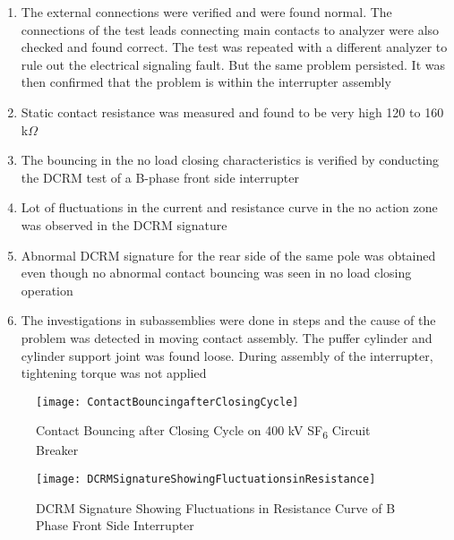 \begin{enumerate}
\item The external connections were verified and were found normal. The connections of the test leads connecting main contacts to analyzer were also checked and found correct. The test was repeated with a different analyzer to rule out the electrical signaling fault. But the same problem persisted. It was then confirmed that the problem is within the interrupter assembly

\item Static contact resistance was measured and found to be very high 120 to 160 k$\Omega$

\item The bouncing in the no load closing characteristics is verified by conducting the DCRM test of a B-phase front side interrupter

\item Lot of fluctuations in the current and resistance curve in the no action zone was observed in the DCRM signature

\item Abnormal DCRM signature for the rear side of the same pole was obtained even though no abnormal contact bouncing was seen in no load closing operation

\item The investigations in subassemblies were done in steps and the cause of the problem was detected in moving contact assembly. The puffer cylinder and cylinder support joint was found loose. During assembly of the interrupter, tightening torque was not applied
\end{enumerate}

\begin{figure}[!htbp]
    \centering
    \texttt{[image: ContactBouncingafterClosingCycle]}
    \caption{Contact Bouncing after Closing Cycle on 400 kV SF\textsubscript{6} Circuit Breaker}
    \label{fig:Contact Bouncing after Closing Cycle on 400 kV SF6 Circuit Breaker}
\end{figure}

\begin{figure}[!htbp]
    \centering
    \texttt{[image: DCRMSignatureShowingFluctuationsinResistance]}
    \caption{DCRM Signature Showing Fluctuations in Resistance Curve of B Phase Front Side Interrupter}
    \label{fig:DCRM Signature Showing Fluctuations in Resistance Curve of B Phase Front Side Interrupter}
\end{figure}

